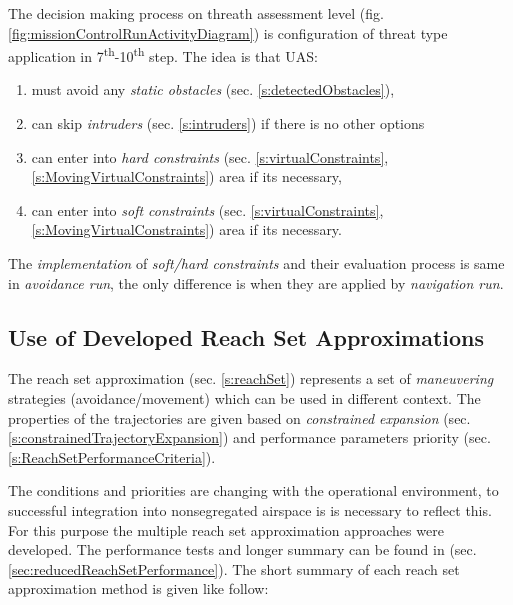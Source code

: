 The decision making process on threath assessment level (fig. \ref{fig:missionControlRunActivityDiagram}) is configuration of threat type application in 7\textsuperscript{th}-10\textsuperscript{th} step. The idea is that UAS:
\begin{enumerate}
    \item must avoid any \emph{static obstacles} (sec. \ref{s:detectedObstacles}),
    
    \item can skip \emph{intruders} (sec. \ref{s:intruders}) if there is no other options
    
    \item can enter into \emph{hard constraints} (sec. \ref{s:virtualConstraints}, \ref{s:MovingVirtualConstraints}) area if its necessary,
    
    \item can enter into \emph{soft constraints} (sec. \ref{s:virtualConstraints}, \ref{s:MovingVirtualConstraints}) area if its necessary.
\end{enumerate}

\begin{note}
    The \emph{implementation} of \emph{soft/hard constraints} and their evaluation process is same in \emph{avoidance run}, the only difference is when they are applied by \emph{navigation run}.
\end{note}
    
\subsection{Use of Developed Reach Set Approximations}\label{s:conclusionReachSet}

\noindent The reach set approximation (sec. \ref{s:reachSet}) represents a set of  \emph{maneuvering} strategies (avoidance/movement) which can be used in different context. The properties of the trajectories are given based on \emph{constrained expansion} (sec. \ref{s:constrainedTrajectoryExpansion}) and performance parameters priority (sec. \ref{s:ReachSetPerformanceCriteria}).

The conditions and priorities are changing with the operational environment, to successful integration into nonsegregated airspace is is necessary to reflect this.  For this purpose the multiple reach set approximation approaches were developed. The performance tests and longer summary can be found in (sec. \ref{sec:reducedReachSetPerformance}). The short summary of each reach set approximation method is given like follow:

